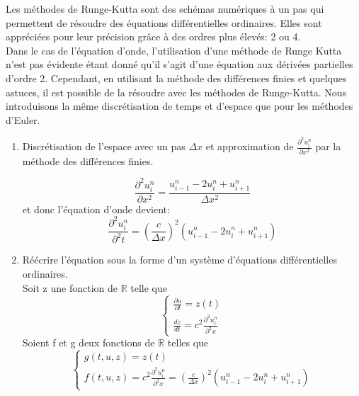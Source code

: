 Les méthodes de Runge-Kutta sont des schémas numériques à un pas qui permettent de résoudre des équations différentielles ordinaires.
Elles sont appréciées pour leur précision grâce à des ordres plus élevés: 2 ou 4.\\

Dans le cas de l'équation d'onde, l'utilisation d'une méthode de Runge Kutta n'est pas évidente étant donné qu'il s'agit d'une équation aux dérivées partielles d'ordre 2. Cependant, en utilisant la méthode des différences finies et quelques astuces, il est possible de la résoudre avec les méthodes de Runge-Kutta.
Nous introduisons la même discrétisation de temps et d'espace que pour les méthodes d'Euler.

\begin{enumerate}
    \item Discrétisation de l'espace avec un pas $\Delta x$ et approximation de $\frac{\partial^2u^n_{i}}{\partial x^2}$ par la méthode des différences finies.
    
    \begin{equation*}
        \frac{\partial^2u^n_{i}}{\partial x^2}=\frac{u^n_{i-1} - 2u^n_{i} + u^n_{i+1}}{\Delta x^2} 
    \end{equation*}
    et donc l'équation d'onde devient:
    \begin{equation*}
        \frac{\partial^2u^n_{i}}{\partial^2t}=(\frac{c}{\Delta x})^2(u^n_{i-1} - 2u^n_{i} + u^n_{i+1})
    \end{equation*}
    
    \item Réécrire l'équation sous la forme d'un système d'équations différentielles ordinaires.\\
    
    Soit z une fonction de $\mathbb{R}$ telle que\\
    \[
      \begin{cases}
        \frac{\partial u}{\partial t}=z(t) \\
        \frac{dz}{dt}= c^2 \frac{\partial^2u^n_{i}}{\partial^2 x}
      \end{cases}
    \]
    \newline
    Soient f et g deux fonctions de $\mathbb{R}$ telles que 
      \[
      \begin{cases}
        g(t,u,z)=z(t) \\
        f(t,u,z)=c^2 \frac{\partial^2u^n_{i}}{\partial^2 x}=(\frac{c}{\Delta x})^2(u^n_{i-1} - 2u^n_{i} + u^n_{i+1})
      \end{cases}
    \]
    

\end{enumerate}
